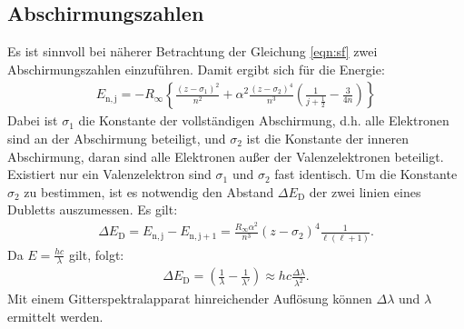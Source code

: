 \subsection{Abschirmungszahlen}
Es ist sinnvoll bei näherer Betrachtung der Gleichung \eqref{eqn:sf} zwei Abschirmungszahlen einzuführen.
Damit ergibt sich für die Energie:
\begin{align}
  E_\mathrm{n,j}=-R_\mathrm{\infty}\left\{\frac{(z-\sigma_\mathrm{1})^2}{n^2}+\alpha^2\frac{(z-\sigma_\mathrm{2})^4}{n^3}\left(\frac{1}{j+\frac{1}{2}}-\frac{3}{4n}\right)\right\}
\end{align}
Dabei ist $\sigma_\mathrm{1}$ die Konstante der vollständigen Abschirmung, d.h. alle Elektronen sind an der Abschirmung beteiligt,
und $\sigma_\mathrm{2}$ ist die Konstante der inneren Abschirmung, daran sind alle Elektronen außer der Valenzelektronen beteiligt.
Existiert nur ein Valenzelektron sind $\sigma_\mathrm{1}$ und $\sigma_\mathrm{2}$ fast identisch.
Um die Konstante $\sigma_\mathrm{2}$ zu bestimmen, ist es notwendig den Abstand $\Delta E_\mathrm{D}$ der zwei linien eines Dubletts auszumessen.
Es gilt:
\begin{align}
  \Delta E_\mathrm{D} = E_\mathrm{n,j}-E_\mathrm{n,j+1}=\frac{R_\mathrm{\infty}\alpha^2}{n^3}(z-\sigma_\mathrm{2})^4\frac{1}{\ell(\ell+1)}. \label{popo}
\end{align}
Da $E=\frac{hc}{\lambda}$ gilt, folgt:
\begin{align}
\Delta E_\mathrm{D}=\left(\frac{1}{\lambda}-\frac{1}{\lambda'}\right) \approx hc\frac{\Delta\lambda}{\lambda^2}.\label{eqn:E}
\end{align}
Mit einem Gitterspektralapparat hinreichender Auflösung können $\Delta\lambda$ und $\lambda$ ermittelt werden.
